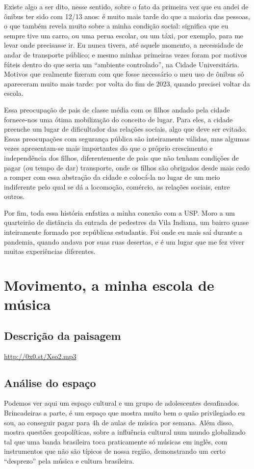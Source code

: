 \documentclass[12pt]{article}
\begin{document}
Existe algo a ser dito, nesse sentido, sobre o fato da primeira vez que eu andei de ônibus ter sido com 12/13 anos: é muito mais tarde do que a maioria das pessoas, o que também revela muito sobre a minha condição social: significa que eu sempre tive um carro, ou uma perua escolar, ou um táxi, por exemplo, para me levar onde precisasse ir. Eu nunca tivera, até aquele momento, a necessidade de andar de transporte público; e mesmo minhas primeiras vezes foram por motivos fúteis dentro do que seria um ``ambiente controlado'', na Cidade Universitária. Motivos que realmente fizeram com que fosse necessário o meu uso de ônibus só apareceram muito mais tarde: por volta do fim de 2023, quando precisei voltar da escola.

Essa preocupação de pais de classe média com os filhos andado pela cidade fornece-nos uma ótima mobilização do conceito de lugar. Para eles, a cidade preenche um lugar de dificultador das relações sociais, algo que deve ser evitado. Essas preocupações com segurança pública são inteiramente válidas, mas algumas vezes apresentam-se mais importantes do que o próprio crescimento e independência dos filhos, diferentemente de pais que não tenham condições de pagar (ou tempo de dar) transporte, onde os filhos são obrigados desde mais cedo a romper com essa abstração da cidade e colocá-la no lugar de um meio indiferente pelo qual se dá a locomoção, comércio, as relações sociais, entre outros.

Por fim, toda essa história enfatiza a minha conexão com a USP. Moro a um quarteirão de distância da entrada de pedestres da Vila Indiana, um bairro quase inteiramente formado por repúblicas estudantis. Foi onde eu mais saí durante a pandemia, quando andava por suas ruas desertas, e é um lugar que me fez viver muitas experiências diferentes. 

\section{Movimento, a minha escola de música}
\subsection{Descrição da paisagem}
\url{http://0x0.st/Xso2.mp3}
\subsection{Análise do espaço}
Podemos ver aqui um espaço cultural e um grupo de adolescentes desafinados. 
Brincadeiras a parte, é um espaço que mostra muito bem o quão privilegiado eu sou, ao conseguir pagar para 4h de aulas de música por semana. Além disso, mostra questões geopolíticas, sobre a influência cultural num mundo globalizado tal que uma banda brasileira toca praticamente só músicas em inglês, com instrumentos que não são típicos de nossa região, demonstrando um certo ``desprezo'' pela música e cultura brasileira.
\end{document}
